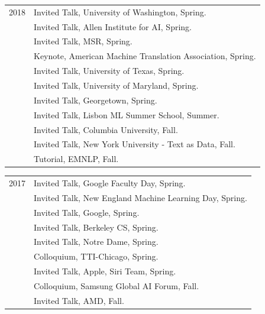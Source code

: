 \documentclass[10pt]{article}
\begin{document}
{{{{\hspace{-1cm} \begin{tabular}{lp{11.5cm}}
	2018
	 & \ind   Invited Talk, University of Washington, Spring.            \\
	 & \ind   Invited Talk, Allen Institute for AI, Spring.              \\
	 & \ind   Invited Talk, MSR, Spring.                                 \\
	 & \ind   Keynote, American Machine Translation Association, Spring. \\
	 & \ind   Invited Talk, University of Texas, Spring.                 \\
	 & \ind   Invited Talk, University of Maryland, Spring.              \\
	 & \ind   Invited Talk, Georgetown, Spring.                          \\
	 & \ind   Invited Talk, Lisbon ML Summer School, Summer.             \\
	 & \ind   Invited Talk, Columbia University, Fall.                   \\
	 & \ind   Invited Talk, New York University - Text as Data, Fall.    \\
	 & \ind   Tutorial, EMNLP, Fall.                                     \\
\end{tabular}

\hspace{-1cm} \begin{tabular}{lp{11.5cm}}
	2017
	 & \ind   Invited Talk, Google Faculty Day, Spring.               \\
	 & \ind   Invited Talk, New England Machine Learning Day, Spring. \\
	 & \ind   Invited Talk, Google, Spring.                           \\
	 & \ind   Invited Talk, Berkeley CS, Spring.                      \\
	 & \ind   Invited Talk, Notre Dame, Spring.                       \\
	 & \ind   Colloquium, TTI-Chicago, Spring.                        \\
	 & \ind   Invited Talk, Apple, Siri Team, Spring.                 \\
	 & \ind   Colloquium, Samsung Global AI Forum, Fall.              \\
	 & \ind   Invited Talk, AMD, Fall.                                \\
\end{tabular}

}}}}
\end{document}
